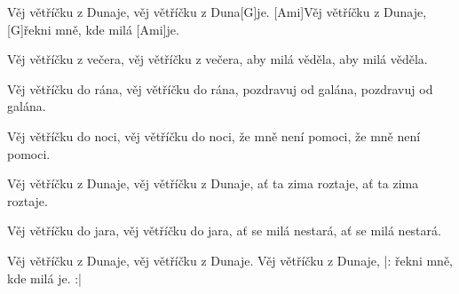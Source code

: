 
\sloka
[Ami]Věj větříčku z Dunaje, věj větříčku z Duna[G]je.
[Ami]Věj větříčku z Dunaje, [G]řekni mně, kde milá [Ami]je.

\sloka
Věj větříčku z večera, věj větříčku z večera,
aby milá věděla, aby milá věděla.

\sloka
Věj větříčku do rána, věj větříčku do rána,
pozdravuj od galána, pozdravuj od galána.

\sloka
Věj větříčku do noci, věj větříčku do noci,
že mně není pomoci, že mně není pomoci.

\sloka
Věj větříčku z Dunaje, věj větříčku z Dunaje,
ať ta zima roztaje, ať ta zima roztaje.

\sloka
Věj větříčku do jara, věj větříčku do jara,
ať se milá nestará, ať se milá nestará.

\sloka
Věj větříčku z Dunaje, věj větříčku z Dunaje.
Věj větříčku z Dunaje, |: řekni mně, kde milá je. :|
